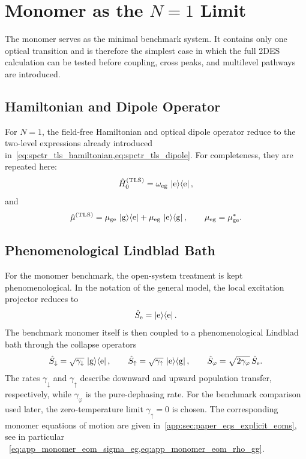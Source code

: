 \section{Monomer as the \texorpdfstring{$N=1$}{N=1} Limit}
\label{sec:model_tls}

The monomer serves as the minimal benchmark system. It contains only one
optical transition and is therefore the simplest case in which the full 2DES
calculation can be tested before coupling, cross peaks, and multilevel
pathways are introduced.

\subsection{Hamiltonian and Dipole Operator}

For \(N=1\), the field-free Hamiltonian and optical dipole operator reduce to
the two-level expressions already introduced
in~\cref{eq:spctr_tls_hamiltonian,eq:spctr_tls_dipole}. For completeness, they
are repeated here:
\begin{equation*}
\hat{H}_{0}^{(\mathrm{TLS})} = \omega_{\mathrm{eg}}\,\ket{\mathrm{e}}\!\bra{\mathrm{e}},
\end{equation*}
and
\begin{equation*}
\hat{\mu}^{(\mathrm{TLS})}
= \mu_{\mathrm{ge}}\,\ket{\mathrm{g}}\!\bra{\mathrm{e}} + \mu_{\mathrm{eg}}\,\ket{\mathrm{e}}\!\bra{\mathrm{g}},
\qquad
\mu_{\mathrm{eg}}=\mu_{\mathrm{ge}}^{*}.
\end{equation*}

\subsection{Phenomenological Lindblad Bath}
\label{subsec:model_tls_lindblad}

For the monomer benchmark, the open-system treatment is kept
phenomenological. In the notation of the general model,
the local excitation projector reduces to
\begin{equation*}
\hat{S}_{\mathrm{e}} = \ket{\mathrm{e}}\!\bra{\mathrm{e}}.
\end{equation*}
The benchmark monomer itself is then coupled to a phenomenological Lindblad
bath through the collapse operators
\begin{equation*}
\hat{S}_{\downarrow} = \sqrt{\gamma_{\downarrow}}\,\ket{\mathrm{g}}\!\bra{\mathrm{e}},
\qquad
\hat{S}_{\uparrow} = \sqrt{\gamma_{\uparrow}}\,\ket{\mathrm{e}}\!\bra{\mathrm{g}},
\qquad
\hat{S}_{\varphi} = \sqrt{2\gamma_{\varphi}}\,\hat{S}_{\mathrm{e}}.
\end{equation*}
The rates \(\gamma_{\downarrow}\) and \(\gamma_{\uparrow}\) describe downward
and upward population transfer, respectively, while \(\gamma_{\varphi}\) is the
pure-dephasing rate. For the benchmark comparison used later, the
zero-temperature limit \(\gamma_{\uparrow}=0\) is chosen. The corresponding
monomer equations of motion are given in~\autoref{app:sec:paper_eqs_explicit_eoms}, see in particular
~\cref{eq:app_monomer_eom_sigma_eg,eq:app_monomer_eom_rho_gg}.

